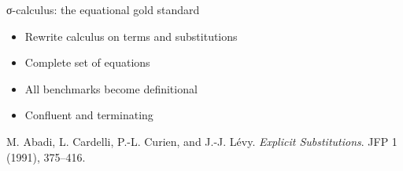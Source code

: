 \documentclass[pdftex,aspectratio=169]{beamer}
\newcommand{\source}[1]{\vfill{\scriptsize\color{muted}#1}}
\begin{document}
\begin{frame}{σ-calculus: the equational gold standard}
      \begin{itemize}
        \item Rewrite calculus on terms and substitutions
        \item Complete set of equations
        \item All benchmarks become definitional
        \item Confluent and terminating
      \end{itemize}

  \source{M. Abadi, L. Cardelli, P.-L. Curien, and J.-J. Lévy. \emph{Explicit Substitutions}. JFP 1 (1991), 375--416.}
\end{frame}
\end{document}
